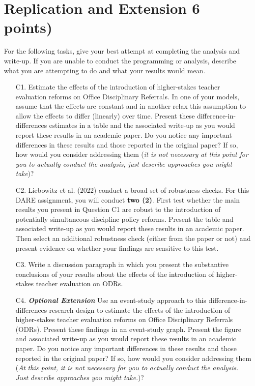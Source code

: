 \documentclass[a4paper, 11pt]{article}
\begin{document}
\begin{enumerate}
\end{enumerate}

\section{Replication and Extension 6 points)}
For the following tasks, give your best attempt at completing the analysis and write-up. If you are unable to conduct the programming or analysis, describe what you are attempting to do and what your results would mean.

\begin{enumerate}
	\item[C1.] Estimate the effects of the introduction of higher-stakes teacher evaluation reforms on Office Disciplinary Referrals. In one of your models, assume that the effects are constant and in another relax this assumption to allow the effects to differ (linearly) over time. Present these difference-in-differences estimates in a table and the associated write-up as you would report these results in an academic paper. Do you notice any important differences in these results and those reported in the original paper? If so, how would you consider addressing them (\textit{it is not necessary at this point for you to actually conduct the analysis, just describe approaches you might take})?
	\item[C2.] Liebowitz et al. (2022) conduct a broad set of robustness checks. For this DARE assignment, you will conduct \textbf{two (2)}. First test whether the main results you present in Question C1 are robust to the introduction of potentially simultaneous discipline policy reforms. Present the table and associated write-up as you would report these results in an academic paper. Then select an additional robustness check (either from the paper or not) and present evidence on whether your findings are sensitive to this test.
	\item[C3.] Write a discussion paragraph in which you present the substantive conclusions of your results about the effects of the introduction of higher-stakes teacher evaluation on ODRs.
	\item[C4.]  \textbf{\textit{Optional Extension}} Use an event-study approach to this difference-in-differences research design to estimate the effects of the introduction of higher-stakes teacher evaluation reforms on Office Disciplinary Referrals (ODRs). Present these findings in an event-study graph. Present the figure and associated write-up as you would report these results in an academic paper. Do you notice any important differences in these results and those reported in the original paper? If so, how would you consider addressing them (\textit{At this point, it is not necessary for you to actually conduct the analysis. Just describe approaches you might take.})?

\end{enumerate}
\end{document}
